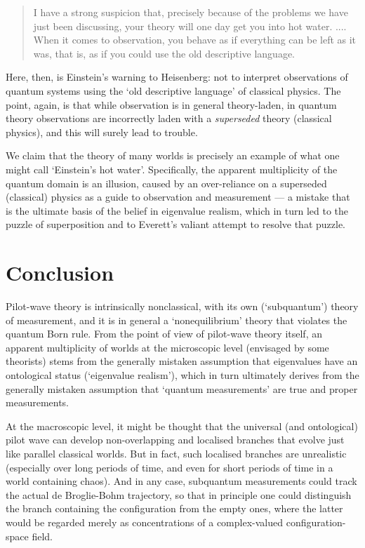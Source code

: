 \documentclass{article}%
\begin{document}
\begin{quote}
I have a strong suspicion that, precisely because of the problems we have just
been discussing, your theory will one day get you into hot water. .... When it
comes to observation, you behave as if everything can be left as it was, that
is, as if you could use the old descriptive language.
\end{quote}
Here, then, is Einstein's warning to Heisenberg: not to interpret
observations of quantum systems using the `old descriptive language' of
classical physics. The point, again, is that while observation is in general
theory-laden, in quantum theory observations are incorrectly laden with a
\textit{superseded }theory (classical physics), and this will surely lead to trouble.

We claim that the theory of many worlds is precisely an example of what one
might call `Einstein's hot water'. Specifically, the apparent multiplicity of
the quantum domain is an illusion, caused by an over-reliance on a superseded
(classical) physics as a guide to observation and measurement --- a mistake
that is the ultimate basis of the belief in eigenvalue realism, which in turn
led to the puzzle of superposition and to Everett's valiant attempt to resolve
that puzzle.

\section{Conclusion}

Pilot-wave theory is intrinsically nonclassical, with its own (`subquantum')
theory of measurement, and it is in general a `nonequilibrium' theory that
violates the quantum Born rule. From the point of view of pilot-wave theory
itself, an apparent multiplicity of worlds at the microscopic level (envisaged
by some theorists) stems from the generally mistaken assumption that
eigenvalues have an ontological status (`eigenvalue realism'), which in turn
ultimately derives from the generally mistaken assumption that `quantum
measurements' are true and proper measurements.

At the macroscopic level, it might be thought that the universal (and
ontological) pilot wave can develop non-overlapping and localised branches
that evolve just like parallel classical worlds. But in fact, such localised
branches are unrealistic (especially over long periods of time, and even for
short periods of time in a world containing chaos). And in any case,
subquantum measurements could track the actual de Broglie-Bohm trajectory, so
that in principle one could distinguish the branch containing the
configuration from the empty ones, where the latter would be regarded merely
as concentrations of a complex-valued configuration-space field.
\end{document}
